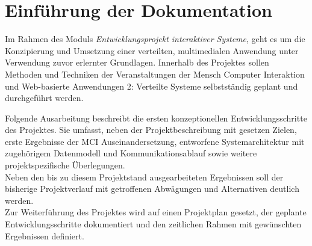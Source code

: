 
\chapter{Einführung der Dokumentation}
Im Rahmen des Moduls \textit{Entwicklungsprojekt interaktiver Systeme}, geht es um die Konzipierung und Umsetzung einer verteilten, multimedialen Anwendung unter Verwendung zuvor erlernter Grundlagen. Innerhalb des Projektes sollen Methoden und Techniken der Veranstaltungen der Mensch Computer Interaktion und Web-basierte Anwendungen 2: Verteilte Systeme selbstständig geplant und durchgeführt werden.

\vspace{0.5cm}

Folgende Ausarbeitung beschreibt die ersten konzeptionellen Entwicklungsschritte des Projektes. Sie umfasst, neben der  Projektbeschreibung mit gesetzen Zielen, erste Ergebnisse der MCI Auseinandersetzung, entworfene Systemarchitektur mit zugehörigem Datenmodell und Kommunikationsablauf sowie weitere projektspezifische Überlegungen.\\
Neben den bis zu diesem Projektstand ausgearbeiteten Ergebnissen soll der bisherige Projektverlauf mit getroffenen Abwägungen und Alternativen deutlich werden.\\
Zur Weiterführung des Projektes wird auf einen Projektplan gesetzt, der geplante Entwicklungsschritte dokumentiert und den zeitlichen Rahmen mit gewünschten Ergebnissen definiert.
